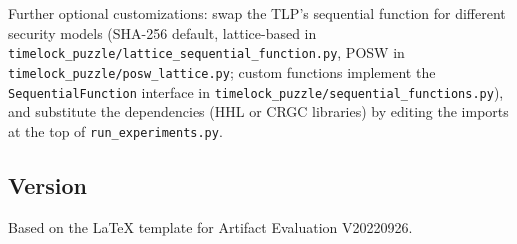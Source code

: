 \documentclass[nonacm,sigconf]{acmart}
\begin{document}
\noindent Further optional customizations: swap the TLP's
sequential function for different security models
(SHA-256 default, lattice-based in
\texttt{timelock\_puzzle/}\-\texttt{lattice\_sequential\_function.py},
POSW in
\texttt{timelock\_puzzle/}\-\texttt{posw\_lattice.py}; custom
functions implement the
\texttt{SequentialFunction} interface in
\texttt{timelock\_puzzle/}\-\texttt{sequential\_functions.py}),
and substitute the dependencies (HHL or CRGC libraries) by editing
the imports at the top of \texttt{run\_experiments.py}.

\subsection{Version}
Based on the LaTeX template for Artifact Evaluation V20220926.







\end{document}
